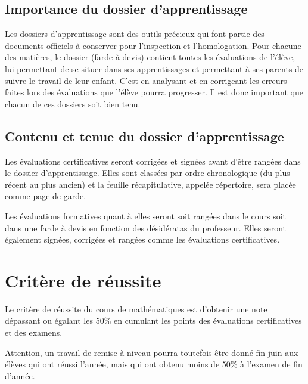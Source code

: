 \documentclass[parskip=half-, numbers=enddot]{scrartcl}
\begin{document}
\subsection{Importance du dossier d'apprentissage}

Les dossiers d'apprentissage sont des outils précieux qui font partie
des documents officiels à conserver pour l'inspection et l'homologation.
Pour chacune des matières, le dossier (farde à devis) contient toutes
les évaluations de l'élève, lui permettant de se situer dans ses
apprentissages et permettant à ses parents de suivre le travail de leur
enfant. C'est en analysant et en corrigeant les erreurs faites lors des
évaluations que l'élève pourra progresser. Il est donc important que
chacun de ces dossiers soit bien tenu.

\subsection{Contenu et tenue du dossier d'apprentissage}

Les évaluations certificatives seront corrigées et signées avant d'être rangées dans le
dossier d'apprentissage. Elles sont classées par ordre chronologique (du
plus récent au plus ancien) et la feuille récapitulative, appelée
répertoire, sera placée comme page de garde.

Les évaluations formatives quant à elles seront soit rangées dans le cours soit dans une farde à devis en fonction des désidératas du professeur. Elles seront également signées, corrigées et rangées comme les évaluations certificatives.

\section{Critère de réussite}

Le critère de réussite du cours de mathématiques est d'obtenir une note dépassant ou égalant les 50\% en cumulant les points des évaluations certificatives et des examens.

Attention, un travail de remise à niveau pourra toutefois être donné fin juin aux élèves qui ont réussi l'année, mais qui ont obtenu moins de 50\% à l'examen de fin d'année.
\end{document}
